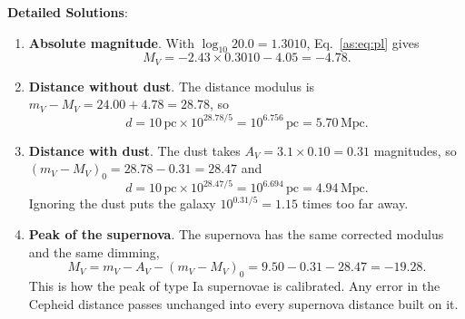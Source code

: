 \textbf{Detailed Solutions}:
\begin{enumerate}[label=(\alph*)]
	\item \textbf{Absolute magnitude}. With $\log_{10}20.0=1.3010$, Eq.~\eqref{as:eq:pl} gives
	\[
	\boxed{M_V=-2.43\times0.3010-4.05=-4.78.}
	\]

	\item \textbf{Distance without dust}. The distance modulus is $m_V-M_V=24.00+4.78=28.78$, so
	\[
	\boxed{d=10\,\mathrm{pc}\times10^{28.78/5}=10^{6.756}\,\mathrm{pc}=5.70\,\mathrm{Mpc}.}
	\]

	\item \textbf{Distance with dust}. The dust takes $A_V=3.1\times0.10=0.31$ magnitudes, so $(m_V-M_V)_0=28.78-0.31=28.47$ and
	\[
	\boxed{d=10\,\mathrm{pc}\times10^{28.47/5}=10^{6.694}\,\mathrm{pc}=4.94\,\mathrm{Mpc}.}
	\]
	Ignoring the dust puts the galaxy $10^{0.31/5}=1.15$ times too far away.

	\item \textbf{Peak of the supernova}. The supernova has the same corrected modulus and the same dimming,
	\[
	\boxed{M_V=m_V-A_V-(m_V-M_V)_0=9.50-0.31-28.47=-19.28.}
	\]
	This is how the peak of type Ia supernovae is calibrated. Any error in the Cepheid distance passes unchanged into every supernova distance built on it.
\end{enumerate}
